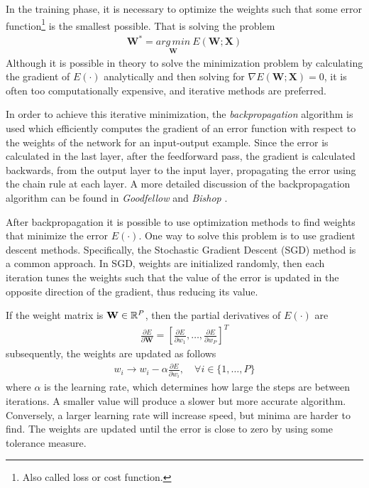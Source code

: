 In the training phase, it is necessary to optimize the weights such that some error function\footnote{Also called loss or cost function.} is the smallest possible. That is solving the problem 
\begin{align*}
    \mathbf{W}^*=\underset{\mathbf{W}}{arg\,min}\:E(\mathbf{W};\mathbf{X})
\end{align*}
Although it is possible in theory to solve the minimization problem by calculating the gradient of $E(\cdot)$ analytically and then solving for $\nabla E(\mathbf{W};\mathbf{X})=0$, it is often too computationally expensive, and iterative methods are preferred. 

In order to achieve this iterative minimization, the \textit{backpropagation} algorithm is used which efficiently computes the gradient of an error function with respect to the weights of the network for an input-output example. Since the error is calculated in the last layer, after the feedforward pass, the gradient is calculated backwards, from the output layer to the input layer, propagating the error using the chain rule at each layer. A more detailed discussion of the backpropagation algorithm can be found in \textit{Goodfellow} and \textit{Bishop} \cite{dl-book, bishop}.

After backpropagation it is possible to use optimization methods to find weights that minimize the error $E(\cdot)$. One way to solve this problem is to use gradient descent methods. Specifically, the Stochastic Gradient Descent (SGD) method is a common approach. In SGD, weights are initialized randomly, then each iteration tunes the weights such that the value of the error is updated in the opposite direction of the gradient, thus reducing its value.

If the weight matrix is $\mathbf{W} \in \mathbb{R}^P$, then the partial derivatives of $E(\cdot)$ are
\begin{align*}
    \frac{\partial E}{\partial \mathbf{W}}=\left[\frac{\partial E}{\partial w_1}, \ldots, \frac{\partial E}{\partial w_P}\right]^T
\end{align*}
subsequently, the weights are updated as follows
\begin{align}
    w_i \xrightarrow{} w_i - \alpha \frac{\partial E}{\partial w_i},\quad \forall i \in \{1,\ldots, P\} 
    \label{eq:sgd}
\end{align}
where $\alpha$ is the learning rate, which determines how large the steps are between iterations. A smaller value will produce a slower but more accurate algorithm. Conversely, a larger learning rate will increase speed, but minima are harder to find. The weights are updated until the error is close to zero by using some tolerance measure.

